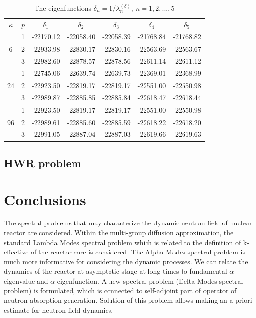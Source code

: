 \documentclass[authoryear]{elsarticle}
\begin{document}
\begin{table}[htp]
\caption{The eigenfunctions $\delta_n = 1 / \lambda_n^{(\delta )}, \ n = 1,2,...,5$}
\label{t-4}
\begin{center}
\begin{tabular}{ccccccc}
\rowcolor{col1}
$\kappa$ & $p$ & $\delta_1$ &  $\delta_2$ &  $\delta_3$ &  $\delta_4$ &  $\delta_5$ \\ 
\rowcolor{col3}
   & 1 & -22170.12 & -22058.40 & -22058.39 & -21768.84 & -21768.82 \\
\rowcolor{col2}
6  & 2 & -22933.98 & -22830.17 & -22830.16 & -22563.69 & -22563.67 \\
\rowcolor{col1}
   & 3 & -22982.60 & -22878.57 & -22878.56 & -22611.14 & -22611.12 \\
\rowcolor{col3}
   & 1 & -22745.06 & -22639.74 & -22639.73 & -22369.01 & -22368.99 \\
\rowcolor{col2}
24 & 2 & -22923.50 & -22819.17 & -22819.17 & -22551.00 & -22550.98 \\
\rowcolor{col1}
   & 3 & -22989.87 & -22885.85 & -22885.84 & -22618.47 & -22618.44 \\
\rowcolor{col3}
   & 1 & -22923.50 & -22819.17 & -22819.17 & -22551.00 & -22550.98 \\
\rowcolor{col2}
96 & 2 & -22989.61 & -22885.60 & -22885.59 & -22618.22 & -22618.20 \\
\rowcolor{col1}
   & 3 & -22991.05 & -22887.04 & -22887.03 & -22619.66 & -22619.63 \\
\end{tabular}
\end{center}
\end{table}

\subsection{HWR problem}

\section{Conclusions} 

The spectral problems that may characterize the dynamic neutron field of nuclear reactor are considered. Within the multi-group diffusion approximation, the standard Lambda Modes spectral problem which is related to the definition of k-effective of the reactor core is considered. The Alpha Modes spectral problem is much more informative for considering the dynamic processes. We can relate the dynamics of the reactor at asymptotic stage at long times to fundamental $\alpha$-eigenvalue and  $\alpha$-eigenfunction. A new spectral problem (Delta Modes spectral problem) is formulated, which is connected to self-adjoint part of operator of neutron absorption-generation. Solution of this problem allows making an a priori estimate for neutron field dynamics.
\end{document}
